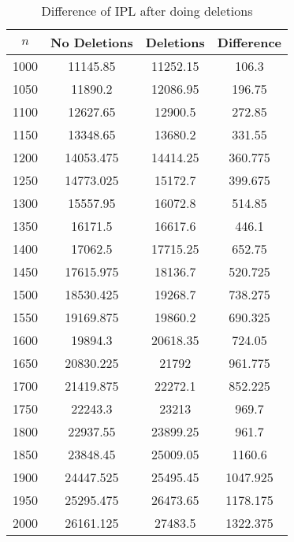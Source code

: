 \begin{table}[ht]
    \centering
    \begin{tabular}{|c|c|c|c|}
        \hline 
        $n$ & No Deletions & Deletions & Difference \\ 
        \hline 
        1000 & 11145.85 & 11252.15 & 106.3 \\ 
        1050 & 11890.2 & 12086.95 & 196.75 \\ 
        1100 & 12627.65 & 12900.5 & 272.85 \\ 
        1150 & 13348.65 & 13680.2 & 331.55 \\ 
        1200 & 14053.475 & 14414.25 & 360.775 \\ 
        1250 & 14773.025 & 15172.7 & 399.675 \\ 
        1300 & 15557.95 & 16072.8 & 514.85 \\ 
        1350 & 16171.5 & 16617.6 & 446.1 \\ 
        1400 & 17062.5 & 17715.25 & 652.75 \\ 
        1450 & 17615.975 & 18136.7 & 520.725 \\ 
        1500 & 18530.425 & 19268.7 & 738.275 \\ 
        1550 & 19169.875 & 19860.2 & 690.325 \\ 
        1600 & 19894.3 & 20618.35 & 724.05 \\ 
        1650 & 20830.225 & 21792 & 961.775 \\ 
        1700 & 21419.875 & 22272.1 & 852.225 \\ 
        1750 & 22243.3 & 23213 & 969.7 \\ 
        1800 & 22937.55 & 23899.25 & 961.7 \\ 
        1850 & 23848.45 & 25009.05 & 1160.6 \\ 
        1900 & 24447.525 & 25495.45 & 1047.925 \\ 
        1950 & 25295.475 & 26473.65 & 1178.175 \\ 
        2000 & 26161.125 & 27483.5 & 1322.375 \\ 
        \hline 
    \end{tabular}
    \caption{Difference of IPL after doing deletions}
    \label{tab:tabDelet}
\end{table}

